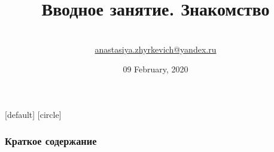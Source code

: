 \documentclass[10pt]{beamer}
\title[Дискретная математика]{Вводное занятие. Знакомство}
\theoremstyle{remark}
\theoremstyle{definition}
\begin{document}
\author[BSU]{
	\begin{tabular}{c} 
	\Large
	\\
    \footnotesize \href{mailto:anastasiya.zhyrkevich@yandex.ru}{anastasiya.zhyrkevich@yandex.ru}
\end{tabular}
\vspace{-4ex}}


\date{09 February, 2020}

\begin{noheadline}
\begin{frame}\maketitle\end{frame}
\end{noheadline}

[default]
[circle]

\begin{frame}
	\frametitle{Краткое содержание} %
	\tableofcontents %
\end{frame}
\end{document}
